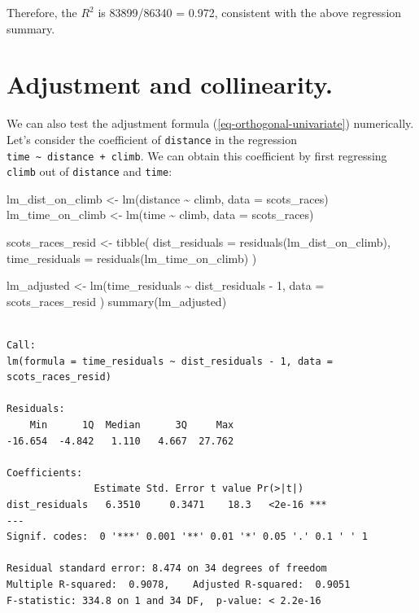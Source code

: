\documentclass[
  11pt,
  letterpaper,
  oneside]{book}
\newenvironment{Shaded}{\begin{snugshade}}{\end{snugshade}}
\newcommand{\AttributeTok}[1]{\textcolor[rgb]{0.40,0.45,0.13}{#1}}
\newcommand{\DecValTok}[1]{\textcolor[rgb]{0.68,0.00,0.00}{#1}}
\newcommand{\FunctionTok}[1]{\textcolor[rgb]{0.28,0.35,0.67}{#1}}
\newcommand{\NormalTok}[1]{\textcolor[rgb]{0.00,0.23,0.31}{#1}}
\newcommand{\OtherTok}[1]{\textcolor[rgb]{0.00,0.23,0.31}{#1}}
\newcommand{\SpecialCharTok}[1]{\textcolor[rgb]{0.37,0.37,0.37}{#1}}
\theoremstyle{plain}
\theoremstyle{plain}
\theoremstyle{definition}
\theoremstyle{definition}
\theoremstyle{plain}
\theoremstyle{remark}
\begin{document}
Therefore, the \(R^2\) is 83899/86340 = 0.972, consistent with the above
regression summary.

\hypertarget{adjustment-and-collinearity.}{%
\section{Adjustment and
collinearity.}\label{adjustment-and-collinearity.}}

We can also test the adjustment formula (\ref{eq-orthogonal-univariate})
numerically. Let's consider the coefficient of \texttt{distance} in the
regression \texttt{time\ \textasciitilde{}\ distance\ +\ climb}. We can
obtain this coefficient by first regressing \texttt{climb} out of
\texttt{distance} and \texttt{time}:

\begin{Shaded}
\begin{Highlighting}[]
\NormalTok{lm\_dist\_on\_climb }\OtherTok{\textless{}{-}} \FunctionTok{lm}\NormalTok{(distance }\SpecialCharTok{\textasciitilde{}}\NormalTok{ climb, }\AttributeTok{data =}\NormalTok{ scots\_races)}
\NormalTok{lm\_time\_on\_climb }\OtherTok{\textless{}{-}} \FunctionTok{lm}\NormalTok{(time }\SpecialCharTok{\textasciitilde{}}\NormalTok{ climb, }\AttributeTok{data =}\NormalTok{ scots\_races)}

\NormalTok{scots\_races\_resid }\OtherTok{\textless{}{-}} \FunctionTok{tibble}\NormalTok{(}
  \AttributeTok{dist\_residuals =} \FunctionTok{residuals}\NormalTok{(lm\_dist\_on\_climb),}
  \AttributeTok{time\_residuals =} \FunctionTok{residuals}\NormalTok{(lm\_time\_on\_climb)}
\NormalTok{)}

\NormalTok{lm\_adjusted }\OtherTok{\textless{}{-}} \FunctionTok{lm}\NormalTok{(time\_residuals }\SpecialCharTok{\textasciitilde{}}\NormalTok{ dist\_residuals }\SpecialCharTok{{-}} \DecValTok{1}\NormalTok{,}
  \AttributeTok{data =}\NormalTok{ scots\_races\_resid}
\NormalTok{)}
\FunctionTok{summary}\NormalTok{(lm\_adjusted)}
\end{Highlighting}
\end{Shaded}

\begin{verbatim}

Call:
lm(formula = time_residuals ~ dist_residuals - 1, data = scots_races_resid)

Residuals:
    Min      1Q  Median      3Q     Max 
-16.654  -4.842   1.110   4.667  27.762 

Coefficients:
               Estimate Std. Error t value Pr(>|t|)    
dist_residuals   6.3510     0.3471    18.3   <2e-16 ***
---
Signif. codes:  0 '***' 0.001 '**' 0.01 '*' 0.05 '.' 0.1 ' ' 1

Residual standard error: 8.474 on 34 degrees of freedom
Multiple R-squared:  0.9078,    Adjusted R-squared:  0.9051 
F-statistic: 334.8 on 1 and 34 DF,  p-value: < 2.2e-16
\end{verbatim}
\end{document}
